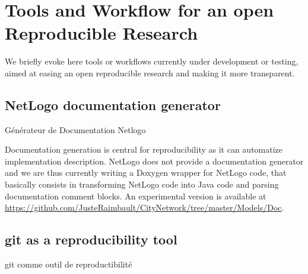 



\chapter{Tools and Workflow for an open Reproducible Research} %

\label{app:workflow} %





%
%
%





\bigskip

We briefly evoke here tools or workflows currently under development or testing, aimed at easing an open reproducible research and making it more transparent.


\section{NetLogo documentation generator}{Générateur de Documentation Netlogo}

Documentation generation is central for reproducibility as it can automatize implementation description. NetLogo does not provide a documentation generator and we are thus currently writing a Doxygen wrapper for NetLogo code, that basically consists in transforming NetLogo code into Java code and parsing documentation comment blocks. An experimental version is available at \url{https://github.com/JusteRaimbault/CityNetwork/tree/master/Models/Doc}.



\section{git as a reproducibility tool}{git comme outil de reproductibilité}

